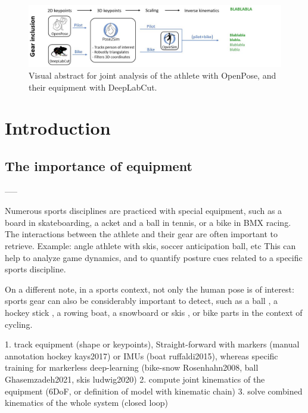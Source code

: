 \newpage

\minitoc

\vspace*{3cm}

\begin{figure}[hbtp]
	\centering
	\def\svgwidth{1\columnwidth}
	\fontsize{10pt}{10pt}\selectfont
	\includegraphics[width=\linewidth]{"../Intro/Figures/Fig_VisAbstract5.JPG"}
      \caption{Visual abstract for joint analysis of the athlete with OpenPose, and their equipment with DeepLabCut.}
	\label{fig_visabstract5}
\end{figure}

\newpage


\section{Introduction}
\subsection{The importance of equipment}



-----

Numerous sports disciplines are practiced with special equipment, such as a board in skateboarding, a  acket and a ball in tennis, or a bike in BMX racing. The interactions between the athlete and their gear are often important to retrieve. Example: angle athlete with skis, soccer anticipation ball, etc
This can help to analyze game dynamics, and to quantify posture cues related to a specific sports discipline.

On a different note, in a sports context, not only the human pose is of interest: sports gear can also be considerably important to detect, such as a ball \cite{Ghasemzadeh2021}, a hockey stick \cite{Kays2017}, a rowing boat\cite{Ruffaldi2015}, a snowboard \cite{Rosenhahn2008} or skis \cite{Ludwig2020}, or bike parts in the context of cycling.  

1. track equipment (shape or keypoints), Straight-forward with markers (manual annotation hockey kays2017) or IMUs (boat ruffaldi2015), whereas specific training for markerless deep-learning (bike-snow Rosenhahn2008, ball Ghasemzadeh2021, skis ludwig2020)
2. compute joint kinematics of the equipment (6DoF, or definition of model with kinematic chain) 
3. solve combined kinematics of the whole system (closed loop)



